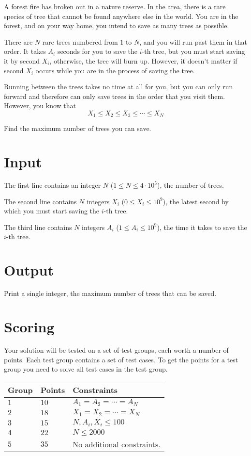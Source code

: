 \noindent
A forest fire has broken out in a nature reserve. In the area, there is a rare species of tree that cannot be found anywhere else in the world. You are in the forest, and on your way home, you intend to save as many trees as possible.

There are $N$ rare trees numbered from $1$ to $N$, and you will run past them in that order.
It takes $A_i$ seconds for you to save the $i$-th tree, but you must start saving it by second $X_i$, otherwise, the tree will burn up. However, it doesn't matter if second $X_i$ occurs while you are in the process of saving the tree.

Running between the trees takes no time at all for you, but you can only run forward and therefore can only save trees in the order that you visit them. However, you know that
$$X_1 \leq X_2 \leq X_3 \leq \cdots \leq X_N$$

Find the maximum number of trees you can save.

\section*{Input}
The first line contains an integer $N$ ($1 \leq N \leq 4 \cdot 10^5$), the number of trees.

The second line contains $N$ integers $X_i$ ($0 \leq X_i \leq 10^9$), the latest second by which you must start saving the $i$-th tree.

The third line contains $N$ integers $A_i$ ($1 \leq A_i \leq 10^9$), the time it takes to save the $i$-th tree.

\section*{Output}
Print a single integer, the maximum number of trees that can be saved.

\section*{Scoring}
Your solution will be tested on a set of test groups, each worth a number of points. Each test group contains
a set of test cases. To get the points for a test group you need to solve all test cases in the test group.

\noindent
\begin{tabular}{| l | l | l |}
  \hline
  \textbf{Group} & \textbf{Points} & \textbf{Constraints} \\ \hline
  $1$   & $10$       & $A_1 = A_2 = \cdots = A_N$\\ \hline
  $2$   & $18$       & $X_1 = X_2 = \cdots = X_N$  \\ \hline
  $3$   & $15$       & $N, A_i, X_i \leq 100$ \\ \hline
  $4$   & $22$       & $N \leq 2000$ \\ \hline
  $5$   & $35$       & No additional constraints. \\ \hline
\end{tabular}

